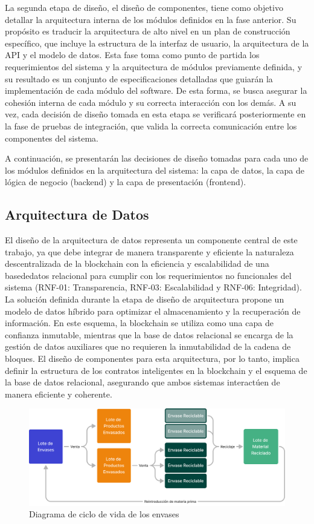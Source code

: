 La segunda etapa de diseño, el diseño de componentes, tiene como objetivo detallar la arquitectura interna de los módulos definidos en la fase anterior. Su propósito es traducir la arquitectura de alto nivel en un plan de construcción específico, que incluye la estructura de la interfaz de usuario, la arquitectura de la API y el modelo de datos. Esta fase toma como punto de partida los requerimientos del sistema y la arquitectura de módulos previamente definida, y su resultado es un conjunto de especificaciones detalladas que guiarán la implementación de cada módulo del software. De esta forma, se busca asegurar la cohesión interna de cada módulo y su correcta interacción con los demás. A su vez, cada decisión de diseño tomada en esta etapa se verificará posteriormente en la fase de pruebas de integración, que valida la correcta comunicación entre los componentes del sistema.

A continuación, se presentarán las decisiones de diseño tomadas para cada uno de los módulos definidos en la arquitectura del sistema: la capa de datos, la capa de lógica de negocio (backend) y la capa de presentación (frontend).

\subsection{Arquitectura de Datos}

El diseño de la arquitectura de datos representa un componente central de este trabajo, ya que debe integrar de manera transparente y eficiente la naturaleza descentralizada de la blockchain con la eficiencia y escalabilidad de una \gls{basededatos} relacional para cumplir con los requerimientos no funcionales del sistema (RNF-01: Transparencia, RNF-03: Escalabilidad y RNF-06: Integridad). La solución definida durante la etapa de diseño de arquitectura propone un modelo de datos híbrido para optimizar el almacenamiento y la recuperación de información. En este esquema, la blockchain se utiliza como una capa de confianza inmutable, mientras que la base de datos relacional se encarga de la gestión de datos auxiliares que no requieren la inmutabilidad de la cadena de bloques. El diseño de componentes para esta arquitectura, por lo tanto, implica definir la estructura de los contratos inteligentes en la blockchain y el esquema de la base de datos relacional, asegurando que ambos sistemas interactúen de manera eficiente y coherente.

\begin{figure}[!b]
    \centering
    \includegraphics[width=\linewidth]{Figures/data-lifecycle.png}
    \caption{Diagrama de ciclo de vida de los envases}
    \label{fig:data-lifecycle}
\end{figure}

